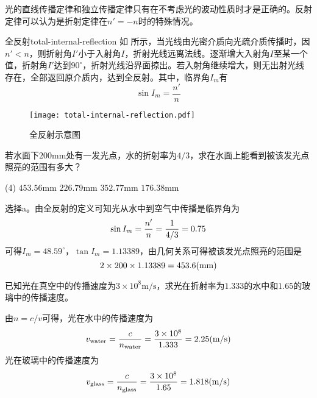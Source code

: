 \documentclass[cn,10pt,chinesefont=founder,math=newtx,cite=super,twoside]{elegantbook}
\begin{document}
\begin{note}
	光的直线传播定律和独立传播定律只有在不考虑光的波动性质时才是正确的。反射定律可以认为是折射定律在$n'=-n$时的特殊情况。
\end{note}

\begin{definition}{全反射}{total-internal-reflection}
	如 所示，当光线由光密介质向光疏介质传播时，因$n'<n$，则折射角$I'$小于入射角$I$，折射光线远离法线。逐渐增大入射角$I$至某一个值，折射角$I'$达到$90^{\circ}$，折射光线沿界面掠出。若入射角继续增大，则无出射光线存在，全部返回原介质内，达到全反射。其中，临界角$I_m$有
	\begin{equation}
	\sin I_m=\frac{n'}{n}
	\end{equation}
\end{definition}

\begin{figure}[htbp]
	\centering
	\texttt{[image: total-internal-reflection.pdf]}
	\caption{全反射示意图}
	\label{fig:total-internal-reflection}
\end{figure}

\begin{problem}
	若水面下$200$mm处有一发光点，水的折射率为$4/3$，求在水面上能看到被该发光点照亮的范围有多大？
	\begin{tasks}(4)
		\task $453.56$mm
		\task $226.79$mm
		\task $352.77$mm
		\task $176.38$mm
	\end{tasks}
\end{problem}
\begin{solution}
	选择a。由全反射的定义可知光从水中到空气中传播是临界角为
	\begin{equation}
	\sin I_m=\frac{n'}{n}=\frac{1}{4/3}=0.75\notag
	\end{equation}
	可得$I_m=48.59^{\circ}$，$\tan I_m=1.13389$，由几何关系可得被该发光点照亮的范围是
	\begin{equation}
	2\times200\times1.13389=453.6(\mathrm{mm})\notag
	\end{equation}
\end{solution}

\begin{problem}
	已知光在真空中的传播速度为$3\times10^8\mathrm{m/s}$，求光在折射率为$1.333$的水中和$1.65$的玻璃中的传播速度。
\end{problem}
\begin{solution}
	由$n=c/v$可得，光在水中的传播速度为
	\begin{equation}
	v_{\mathrm{water}}=\frac{c}{n_{\mathrm{water}}}=\frac{3\times10^8}{1.333}=2.25(\mathrm{m/s})\notag
	\end{equation}
	光在玻璃中的传播速度为
	\begin{equation}
	v_{\mathrm{glass}}=\frac{c}{n_{\mathrm{glass}}}=\frac{3\times10^8}{1.65}=1.818(\mathrm{m/s})\notag
	\end{equation}
\end{solution}
\end{document}
